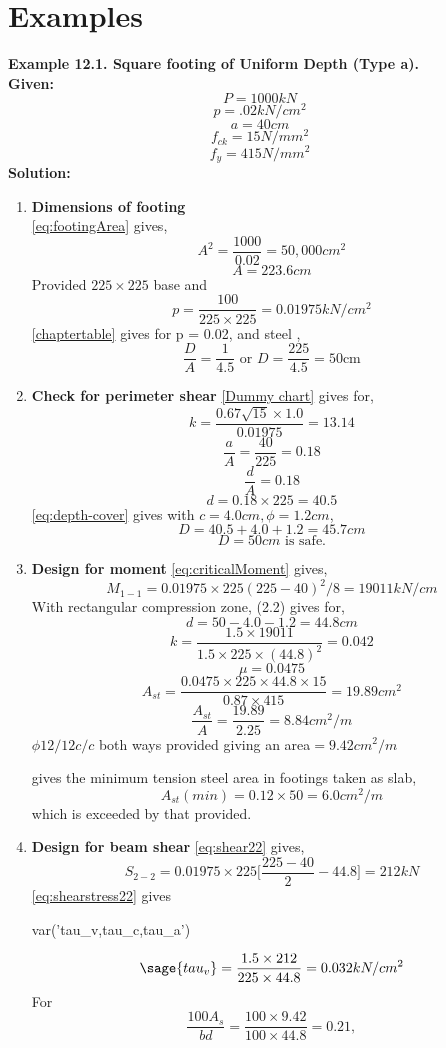 \section{Examples}
\textbf{ Example 12.1. Square footing of Uniform Depth (Type a).}\\
\textbf{ Given:}
$$P = 1000kN$$
$$p = .02 kN/cm^2$$
$$a = 40 cm$$
$$f_{ck} = 15 N/mm^2$$
$$f_y = 415 N/mm^2$$
\textbf{Solution:}
\begin{enumerate}
\item \textbf{Dimensions of footing}\\
        \equmacro \ref{eq:footingArea} gives,
        $$A^2=\frac{1000}{0.02}=50,000 cm^2$$
        $$A=223.6 cm$$
Provided $225 \times 225$ base and
        $$p = \frac{100}{225 \times 225} = 0.01975 kN/cm^2$$
        \tablemacro \ref{chaptertable} gives for p = 0.02, and steel \Fefouronefivemacro,
        $$\frac{D}{A} = \frac{1}{4.5} \text{ or } D = \frac{225}{4.5}=50 \text{cm}$$
\item   \textbf{Check for perimeter shear}
        \chartmacro \ref{Dummy chart} gives for,
        $$k=\frac{0.67\sqrt{15}\times 1.0}{0.01975}=13.14$$
        $$\frac{a}{A}=\frac{40}{225}=0.18$$
        $$\frac{d}{A} = 0.18$$
        $$d=0.18 \times 225 = 40.5$$
\equmacro \ref{eq:depth-cover} gives with $c = 4.0 cm,\phi=1.2cm$,   
        $$D=40.5+4.0+1.2=45.7 cm$$
        $$D = 50cm \text{ is safe.}$$
\item  \textbf{Design for moment}
\equmacro \ref{eq:criticalMoment} gives,
$$M_{1-1}=0.01975 \times225(225-40)^2/8=19011kN/cm$$
With rectangular compression zone, \chartmacro (2.2) gives for,
        $$d=50-4.0-1.2=44.8cm$$
        $$k=\frac{1.5\times19011}{1.5\times225\times(44.8)^2}=0.042$$
        $$\mu = 0.0475$$
        $$A_{st}=\frac{0.0475\times225\times44.8\times15}{0.87\times415}=19.89cm^2$$
        $$\frac{A_{st}}{A}=\frac{19.89}{2.25}=8.84cm^2/m $$
$\phi 12/12 c/c $ both ways provided giving an area$ = 9.42cm^2/m$

 gives the minimum tension steel area in footings taken as slab,
$$A_{st}(min)=0.12\times50=6.0cm^2/m$$
which is exceeded by that provided.
\item  \textbf{Design for beam shear}
        \equmacro \ref{eq:shear22} gives,
        $$S_{2-2}=0.01975\times225\bigg[\frac{225-40}{2}-44.8\bigg]=212kN$$
        \equmacro \ref{eq:shearstress22} gives
\begin{sagesilent}
       var('tau_v,tau_c,tau_a')
\end{sagesilent}
$$\sage{tau_v}=\frac{1.5\times212}{225\times44.8}=0.032kN/cm^2$$
For $$\frac{100A_{s}}{bd}=\frac{100\times9.42}{100\times44.8}=0.21,$$


\end{enumerate}
